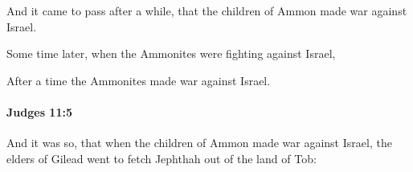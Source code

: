 			\begin{versebox}
					\item[BHS] 
					\item[ASV] And it came to pass after a while, that the children of Ammon made war against Israel.
					\item[NIV] Some time later, when the Ammonites were fighting against Israel,
					\item[NRSV] After a time the Ammonites made war against Israel.
			\end{versebox}

		\paragraph{Judges 11:5} %
			\label{JUDGES-11-5}

			And it was so, that when the children of Ammon made war against Israel, the elders of Gilead went to fetch Jephthah out of the land of Tob:

